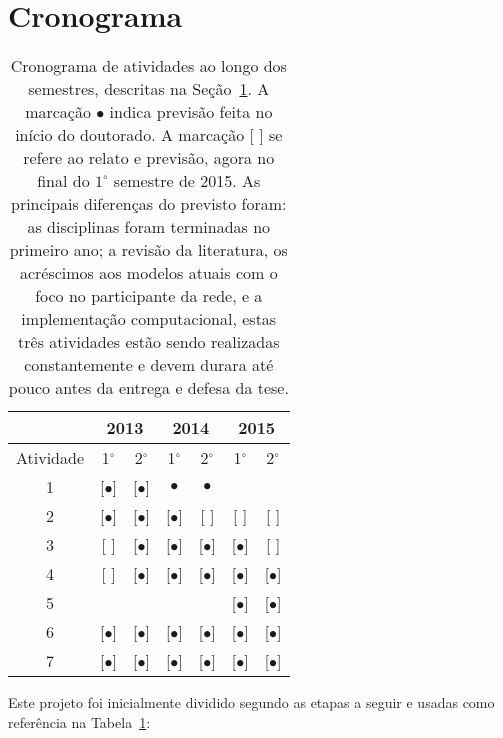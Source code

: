 \documentclass[a4paper,openright,12pt]{report} %
\begin{document}
\section{Cronograma}\label{sec:cron}


\begin{table}[h!]
\label{tab:cron}
\begin{center}
  \begin{tabular}{ | c ||   c | c |     c | c |   c | c |}
    \hline
      & \multicolumn{2}{|c|}{2013} & \multicolumn{2}{|c|}{2014} & \multicolumn{2}{|c|}{2015} \\
    \hline
    Atividade & 1$^{\circ}$ & 2$^{\circ}$ & 1$^{\circ}$ & 2$^{\circ}$ & 1$^{\circ}$ & 2$^{\circ}$ \\
    \hline \hline

    1 & [$\bullet$] & [$\bullet$] & $\bullet$ & $\bullet$ & & \\
    \hline
    2 & [$\bullet$] & [$\bullet$] & [$\bullet$] & [ ] & [ ] & [ ] \\
    \hline
    3 & [ ] & [$\bullet$] & [$\bullet$] & [$\bullet$] & [$\bullet$] & [ ]  \\
    \hline
    4 & [ ] & [$\bullet$] & [$\bullet$] & [$\bullet$] & [$\bullet$] & [$\bullet$]  \\
    \hline
    5 & & & & & [$\bullet$] & [$\bullet$]  \\
    \hline
    6 & [$\bullet$] & [$\bullet$] & [$\bullet$] & [$\bullet$] & [$\bullet$] & [$\bullet$]  \\
    \hline
    7 & [$\bullet$] & [$\bullet$] & [$\bullet$] & [$\bullet$] & [$\bullet$] & [$\bullet$]  \\
    \hline
  \end{tabular}
  \caption{Cronograma de atividades ao longo dos semestres, descritas na Seção~\ref{sec:cron}.
	  A marcação $\bullet$ indica previsão feita no início do doutorado.
  A marcação [ ] se refere ao relato e previsão, agora no final do $1^{\circ}$ semestre de 2015.
  As principais diferenças do previsto foram: as disciplinas foram terminadas no primeiro ano; a revisão da literatura, os acréscimos aos modelos atuais com o foco no participante da rede, e a implementação computacional, estas três atividades estão sendo realizadas constantemente e devem durara até pouco antes da entrega e defesa da tese. }
\label{tab:cron}
\end{center}
\end{table}


Este projeto foi inicialmente dividido segundo as etapas a seguir 
e usadas como referência na Tabela~\ref{tab:cron}:
\end{document}
